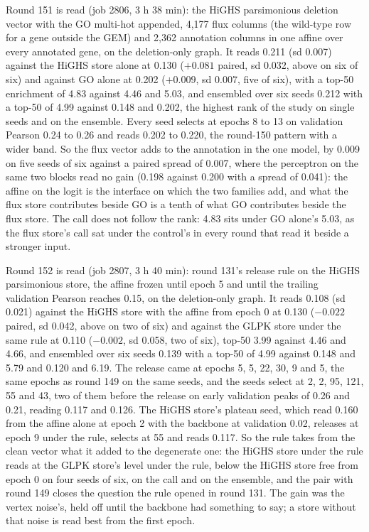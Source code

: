 Round 151 is read (job 2806, 3 h 38 min): the HiGHS parsimonious deletion vector with
the GO multi-hot appended, 4,177 flux columns (the wild-type row for a gene outside the
GEM) and 2,362 annotation columns in one affine over every annotated gene, on the
deletion-only graph. It reads 0.211 (sd 0.007) against the HiGHS store alone at 0.130
($+0.081$ paired, sd 0.032, above on six of six) and against GO alone at 0.202
($+0.009$, sd 0.007, five of six), with a top-50 enrichment of 4.83 against 4.46 and
5.03, and ensembled over six seeds 0.212 with a top-50 of 4.99 against 0.148 and 0.202,
the highest rank of the study on single seeds and on the ensemble. Every seed selects
at epochs 8 to 13 on validation Pearson 0.24 to 0.26 and reads 0.202 to 0.220, the
round-150 pattern with a wider band. So the flux vector adds to the annotation in the
one model, by 0.009 on five seeds of six against a paired spread of 0.007, where the
perceptron on the same two blocks read no gain (0.198 against 0.200 with a spread of
0.041): the affine on the logit is the interface on which the two families add, and
what the flux store contributes beside GO is a tenth of what GO contributes beside the
flux store. The call does not follow the rank: 4.83 sits under GO alone's 5.03, as the
flux store's call sat under the control's in every round that read it beside a stronger
input.

Round 152 is read (job 2807, 3 h 40 min): round 131's release rule on the HiGHS
parsimonious store, the affine frozen until epoch 5 and until the trailing validation
Pearson reaches 0.15, on the deletion-only graph. It reads 0.108 (sd 0.021) against
the HiGHS store with the affine from epoch 0 at 0.130 ($-0.022$ paired, sd 0.042, above
on two of six) and against the GLPK store under the same rule at 0.110 ($-0.002$, sd
0.058, two of six), top-50 3.99 against 4.46 and 4.66, and ensembled over six seeds
0.139 with a top-50 of 4.99 against 0.148 and 5.79 and 0.120 and 6.19. The release came
at epochs 5, 5, 22, 30, 9 and 5, the same epochs as round 149 on the same seeds, and
the seeds select at 2, 2, 95, 121, 55 and 43, two of them before the release on early
validation peaks of 0.26 and 0.21, reading 0.117 and 0.126. The HiGHS store's plateau
seed, which read 0.160 from the affine alone at epoch 2 with the backbone at validation
0.02, releases at epoch 9 under the rule, selects at 55 and reads 0.117. So the rule
takes from the clean vector what it added to the degenerate one: the HiGHS store under
the rule reads at the GLPK store's level under the rule, below the HiGHS store free
from epoch 0 on four seeds of six, on the call and on the ensemble, and the pair with
round 149 closes the question the rule opened in round 131. The gain was the vertex
noise's, held off until the backbone had something to say; a store without that noise
is read best from the first epoch.

